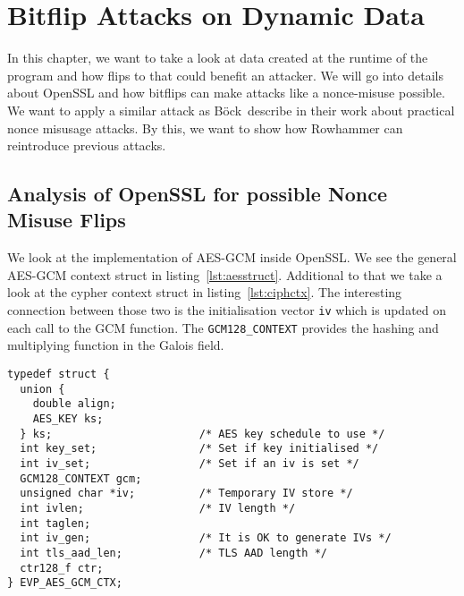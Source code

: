 \chapter{Bitflip Attacks on Dynamic Data}\label{sec:automate}

In this chapter, we want to take a look at data created at the runtime of the
program and how flips to that could benefit an attacker. We will go into details
about OpenSSL and how bitflips can make attacks like a nonce-misuse possible. We
want to apply a similar attack as Böck~\etal describe in their work about
\textquotedbl practical nonce misusage
attacks\textquotedbl\cite{gcmnonceattack}. By this, we want to show how
Rowhammer can reintroduce previous attacks.

\section{Analysis of OpenSSL for possible Nonce Misuse Flips}

We look at the implementation of AES-GCM inside OpenSSL. We see the general
AES-GCM context struct in listing~\ref{lst:aesstruct}. Additional to that we
take a look at the cypher context struct in listing~\ref{lst:ciphctx}. The
interesting connection between those two is the initialisation vector
\texttt{iv} which is updated on each call to the GCM function. The
\texttt{GCM128\_CONTEXT} provides the hashing and multiplying function in the
Galois field.

\begin{minipage}{\linewidth}
\begin{lstlisting}[style=CStyle,
                   caption={Struct used by OpenSSL to describe the AES-GCM
context. The IV used is stored in the memory pointed to by \texttt{iv}. Source
is taken from OpenSSL version $1.1.0g$},
                   label={lst:aesstruct}]
typedef struct {
  union {
    double align;
    AES_KEY ks;
  } ks;                       /* AES key schedule to use */
  int key_set;                /* Set if key initialised */
  int iv_set;                 /* Set if an iv is set */
  GCM128_CONTEXT gcm;
  unsigned char *iv;          /* Temporary IV store */
  int ivlen;                  /* IV length */
  int taglen;
  int iv_gen;                 /* It is OK to generate IVs */
  int tls_aad_len;            /* TLS AAD length */
  ctr128_f ctr;
} EVP_AES_GCM_CTX;
\end{lstlisting}
\end{minipage}

